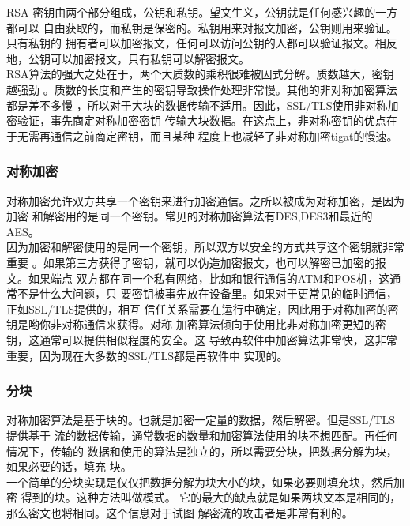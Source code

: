 \documentclass[11pt]{article}
\begin{document}
RSA 密钥由两个部分组成，公钥和私钥。望文生义，公钥就是任何感兴趣的一方都可以
自由获取的，而私钥是保密的。私钥用来对报文加密，公钥则用来验证。只有私钥的
拥有者可以加密报文，任何可以访问公钥的人都可以验证报文。相反地，公钥可以加密报文，只有私钥可以解密报文。\\

RSA算法的强大之处在于，两个大质数的乘积很难被因式分解。质数越大，密钥越强劲
。质数的长度和产生的密钥导致操作处理非常慢。其他的非对称加密算法都是差不多慢
，所以对于大块的数据传输不适用。因此，SSL/TLS使用非对称加密验证，事先商定对称加密密钥
传输大块数据。在这点上，非对称密钥的优点在于无需再通信之前商定密钥，而且某种
程度上也减轻了非对称加密tigat的慢速。 \\

\subsubsection{对称加密}

对称加密允许双方共享一个密钥来进行加密通信。之所以被成为对称加密，是因为加密
和解密用的是同一个密钥。常见的对称加密算法有DES,DES3和最近的AES。\\

因为加密和解密使用的是同一个密钥，所以双方以安全的方式共享这个密钥就非常重要
。如果第三方获得了密钥，就可以伪造加密报文，也可以解密已加密的报文。如果端点
双方都在同一个私有网络，比如和银行通信的ATM和POS机，这通常不是什么大问题，只
要密钥被事先放在设备里。如果对于更常见的临时通信，正如SSL/TLS提供的，相互
信任关系需要在运行中确定，因此用于对称加密的密钥是哟你非对称通信来获得。对称
加密算法倾向于使用比非对称加密更短的密钥，这通常可以提供相似程度的安全。这
导致再软件中加密算法非常快，这非常重要，因为现在大多数的SSL/TLS都是再软件中
实现的。


\subsubsection{分块}

对称加密算法是基于块的。也就是加密一定量的数据，然后解密。但是SSL/TLS提供基于
流的数据传输，通常数据的数量和加密算法使用的块不想匹配。再任何情况下，传输的
数据和使用的算法是独立的，所以需要分块，把数据分解为块，如果必要的话，填充
块。\\

一个简单的分块实现是仅仅把数据分解为块大小的块，如果必要则填充块，然后加密
得到的块。这种方法叫做{}模式。
它的最大的缺点就是如果两块文本是相同的，那么密文也将相同。这个信息对于试图
解密流的攻击者是非常有利的。\\
\end{document}
